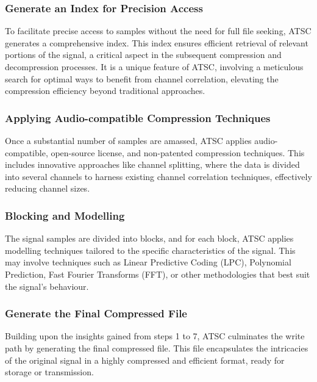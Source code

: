 \documentclass[conference]{IEEEtran}
\begin{document}
\vspace{10pt}
\subsubsection{Generate an Index for Precision Access}
To facilitate precise access to samples without the need for full file seeking, ATSC generates a comprehensive index. This index ensures efficient retrieval of relevant portions of the signal, a critical aspect in the subsequent compression and decompression processes. It is a unique feature of ATSC, involving a meticulous search for optimal ways to benefit from channel correlation, elevating the compression efficiency beyond traditional approaches.

\vspace{10pt}
\subsubsection{Applying Audio-compatible Compression Techniques}
Once a substantial number of samples are amassed, ATSC applies audio-compatible, open-source license, and non-patented compression techniques. This includes innovative approaches like channel splitting, where the data is divided into several channels to harness existing channel correlation techniques, effectively reducing channel sizes.

\vspace{10pt}
\subsubsection{Blocking and Modelling}
The signal samples are divided into blocks, and for each block, ATSC applies modelling techniques tailored to the specific characteristics of the signal. This may involve techniques such as Linear Predictive Coding (LPC), Polynomial Prediction, Fast Fourier Transforms (FFT), or other methodologies that best suit the signal's behaviour.

\vspace{10pt}
\subsubsection{Generate the Final Compressed File}
Building upon the insights gained from steps 1 to 7, ATSC culminates the write path by generating the final compressed file. This file encapsulates the intricacies of the original signal in a highly compressed and efficient format, ready for storage or transmission.
\end{document}
